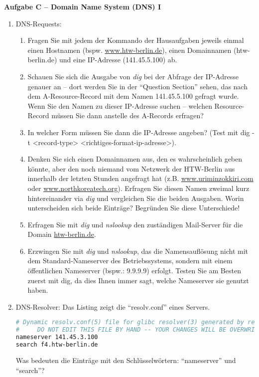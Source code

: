 \documentclass[paper=a4,fontsize=11pt]{scrartcl}%
\numberwithin{equation}{section}
\begin{document}
\begin{center}\Large{\textbf{Aufgabe C -- Domain Name System (DNS) I}}\end{center}\vskip0.25in
\begin{enumerate}
	\item DNS-Requests:
\begin{enumerate}[label=(\alph*)]
		\item Fragen Sie mit jedem der Kommando der Hausaufgaben jeweils einmal einen Hostnamen (bspw. \url{www.htw-berlin.de}), einen Domainnamen (htw-berlin.de) und eine IP-Adresse (141.45.5.100) ab.
		\item Schauen Sie sich die Ausgabe von \emph{dig} bei der Abfrage der IP-Adresse genauer an -- dort werden Sie in der \enquote{Question Section} sehen, das nach dem A-Resource-Record mit dem Namen 141.45.5.100 gefragt wurde. Wenn Sie den Namen zu dieser IP-Adresse suchen -- welchen Resource-Record müssen Sie dann anstelle des A-Records erfragen? 
		\item In welcher Form müssen Sie dann die IP-Adresse angeben? (Test mit dig -t <record-type> <richtiges-format-ip-adresse>).
		\item Denken Sie sich einen Domainnamen aus, den es wahrscheinlich geben könnte, aber den noch niemand vom Netzwerk der HTW-Berlin aus innerhalb der letzten Stunden angefragt hat (z.B. \url{www.uriminzokkiri.com} oder \url{www.northkoreatech.org}). Erfragen Sie diesen Namen zweimal kurz hintereinander via \emph{dig} und vergleichen Sie die beiden Ausgaben. Worin unterscheiden sich beide Einträge? Begründen Sie diese Unterschiede!
		\item Erfragen Sie mit \emph{dig} und \emph{nslookup} den zuständigen Mail-Server für die Domain \url{htw-berlin.de}.
		\item Erzwingen Sie mit \emph{dig} und \emph{nslookup}, das die Namensauflösung nicht mit dem Standard-Nameserver des Betriebssystems, sondern mit einem öffentlichen Nameserver (bspw.: 9.9.9.9) erfolgt. Testen Sie am Besten zuerst mit dig, da dies Ihnen immer sagt, welche Nameserver sie genutzt haben.
	\end{enumerate}
	\item DNS-Resolver: Das Listing zeigt die \enquote{resolv.conf} eines Servers. 
	\begin{lstlisting}[style=Bash, language=Bash]
# Dynamic resolv.conf(5) file for glibc resolver(3) generated by resolvconf(8)
#     DO NOT EDIT THIS FILE BY HAND -- YOUR CHANGES WILL BE OVERWRITTEN
nameserver 141.45.3.100
search f4.htw-berlin.de
\end{lstlisting} \label{dns}
Was bedeuten die Einträge mit den Schlüsselwörtern: \enquote{nameserver} und \enquote{search}?
\end{enumerate}
\end{document}
